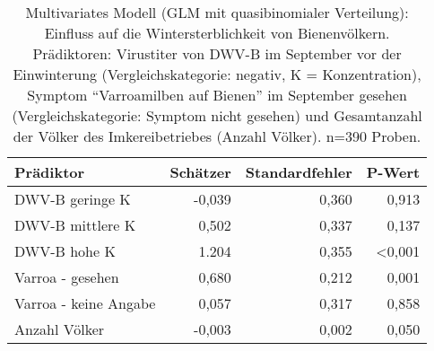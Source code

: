 \begin{table}[htb]
    \caption{Multivariates Modell (GLM mit quasibinomialer Verteilung): Einfluss auf die Wintersterblichkeit von Bienenvölkern. Prädiktoren: Virustiter von DWV-B im September vor der Einwinterung (Vergleichskategorie: negativ, K = Konzentration), Symptom \enquote{Varroamilben auf Bienen} im September gesehen (Vergleichskategorie: Symptom nicht gesehen) und Gesamtanzahl der Völker des Imkereibetriebes (Anzahl Völker). n=390 Proben.}
    \centering
    \label{tab:m:regression}
    \begin{tabular}{l|rrr}
        \toprule
        Prädiktor & Schätzer & Standardfehler & P-Wert \\
        \midrule
        DWV-B geringe K     & -0,039  & 0,360    & 0,913  \\ 
        DWV-B mittlere K    & 0,502   & 0,337    & 0,137\\ 
        DWV-B hohe K        & 1.204   & 0,355    & <0,001\\ 
        \midrule
        Varroa - gesehen        & 0,680 & 0,212 & 0,001 \\
        Varroa - keine Angabe   & 0,057 & 0,317 & 0,858 \\
        \midrule
        Anzahl Völker           & -0,003    & 0,002     & 0,050 \\
        \bottomrule
    \end{tabular}

\end{table}